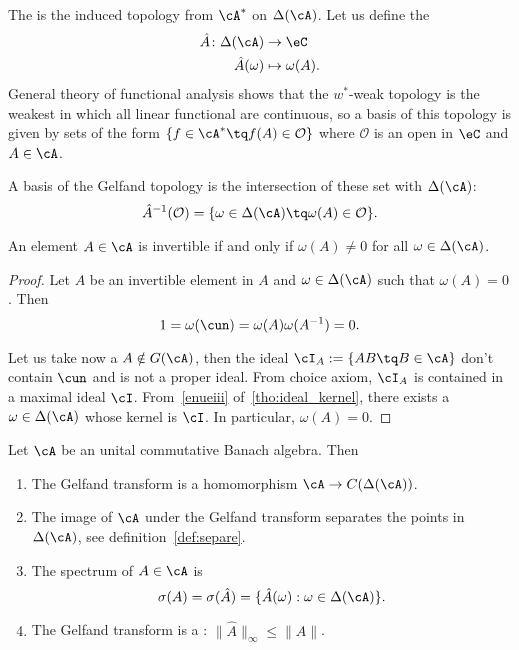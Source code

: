 The  is the induced topology from $\cA^*$ on $\Delta(\cA)$. Let us define the 
\begin{equation}
	\begin{aligned}
		\hat A \colon \Delta(\cA) & \to \eC            \\
		\hat A(\omega)            & \mapsto \omega(A).
	\end{aligned}
\end{equation}
General theory of functional analysis shows that the $w^*$-weak topology is the weakest in which all linear functional are continuous, so a basis of this topology is given by sets of the form $\{f\in\cA^*\tq f(A)\in\mathcal{O}\}$ where $\mathcal{O}$ is an open in $\eC$ and $A\in\cA$.

A basis of the Gelfand topology is the intersection of these set with $\Delta(\cA)$:
\begin{equation}
	\hat A^{-1}(\mathcal{O})=\{\omega\in\Delta(\cA)\tq \omega(A)\in\mathcal{O}\}.
\end{equation}



\begin{lemma}
	An element $A\in\cA$ is invertible if and only if $\omega(A)\neq0$ for all $\omega\in\Delta(\cA)$.
\end{lemma}


\begin{proof}
	Let $A$ be an invertible element in $A$ and $\omega\in\Delta(\cA)$ such that $\omega(A)=0$. Then
	\[
		1=\omega(\cun)=\omega(A)\omega(A^{-1})=0.
	\]

	Let us take now a $A\notin G(\cA)$, then the ideal $\cI_A:=\{AB\tq B\in\cA\}$ don't contain $\cun$ and is not a proper ideal. From choice axiom, $\cI_A$ is contained in a maximal ideal $\cI$. From~\ref{enueiii} of~\ref{tho:ideal_kernel}, there exists a $\omega\in\Delta(\cA)$ whose kernel is $\cI$. In particular, $\omega(A)=0$.
\end{proof}

\begin{theorem}
	Let $\cA$ be an unital commutative Banach algebra. Then
	\begin{enumerate}
		\item The Gelfand transform is a homomorphism $\cA\to C(\Delta(\cA))$. \label{enugi}
		\item The image of $\cA$ under the Gelfand transform separates the points in $\Delta(\cA)$, see definition~\ref{def:separe}. \label{enugii}
		\item \label{enugiii} The spectrum of $A\in\cA$ is
		      \[
			      \sigma(A)=\sigma(\hat A)=\{\hat A(\omega):\omega\in\Delta(\cA)\}.
		      \]
		\item \label{enugiv} The Gelfand transform is a :   $\|\hat A\|_{\infty}\leq\|A\|$.
	\end{enumerate}\label{tho:unital_comm}
\end{theorem}

